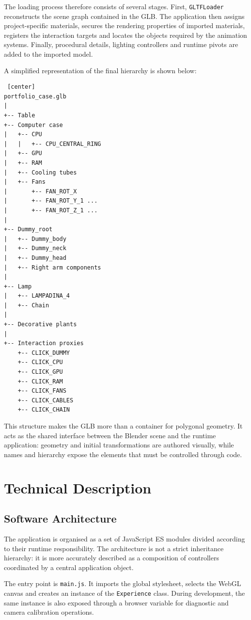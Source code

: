 \documentclass{report}
\begin{document}
The loading process therefore consists of several stages. First,
\texttt{GLTFLoader} reconstructs the scene graph contained in the GLB.
The application then assigns project-specific materials, secures the
rendering properties of imported materials, registers the interaction
targets and locates the objects required by the animation systems.
Finally, procedural details, lighting controllers and runtime pivots are
added to the imported model.

A simplified representation of the final hierarchy is shown below:

\begin{verbatim} [center]
portfolio_case.glb
|
+-- Table
+-- Computer case
|   +-- CPU
|   |   +-- CPU_CENTRAL_RING
|   +-- GPU
|   +-- RAM
|   +-- Cooling tubes
|   +-- Fans
|       +-- FAN_ROT_X
|       +-- FAN_ROT_Y_1 ...
|       +-- FAN_ROT_Z_1 ...
|
+-- Dummy_root
|   +-- Dummy_body
|   +-- Dummy_neck
|   +-- Dummy_head
|   +-- Right arm components
|
+-- Lamp
|   +-- LAMPADINA_4
|   +-- Chain
|
+-- Decorative plants
|
+-- Interaction proxies
    +-- CLICK_DUMMY
    +-- CLICK_CPU
    +-- CLICK_GPU
    +-- CLICK_RAM
    +-- CLICK_FANS
    +-- CLICK_CABLES
    +-- CLICK_CHAIN
\end{verbatim}

This structure makes the GLB more than a container for polygonal
geometry. It acts as the shared interface between the Blender scene and
the runtime application: geometry and initial transformations are
authored visually, while names and hierarchy expose the elements that
must be controlled through code.

\section{Technical Description}

\subsection{Software Architecture}

The application is organised as a set of JavaScript ES modules divided
according to their runtime responsibility. The architecture is not a
strict inheritance hierarchy: it is more accurately described as a
composition of controllers coordinated by a central application object.

The entry point is \texttt{main.js}. It imports the global stylesheet,
selects the WebGL canvas and creates an instance of the
\texttt{Experience} class. During development, the same instance is
also exposed through a browser variable for diagnostic and camera
calibration operations.
\end{document}
